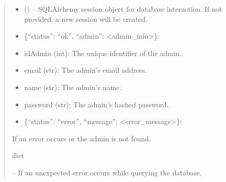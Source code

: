 \documentclass[letterpaper,10pt,english]{sphinxmanual}
\begin{document}
\begin{fulllineitems}
\begin{fulllineitems}
\begin{quote}
\begin{description}
\begin{itemize}
\item {} 
\sphinxAtStartPar
{} (\sphinxstyleliteralemphasis{\sphinxupquote{, }}) – SQLAlchemy session object for database interaction.
If not provided, a new session will be created.

\end{itemize}

\sphinxAtStartPar
\begin{description}
\begin{itemize}
\item {} 
\sphinxAtStartPar
\{“status”: “ok”, “admin”: <admin\_info>\}:

\end{itemize}
\begin{description}
\begin{itemize}
\item {} 
\sphinxAtStartPar
idAdmin (int): The unique identifier of the admin.

\item {} 
\sphinxAtStartPar
email (str): The admin’s email address.

\item {} 
\sphinxAtStartPar
name (str): The admin’s name.

\item {} 
\sphinxAtStartPar
password (str): The admin’s hashed password.

\end{itemize}

\end{description}
\begin{itemize}
\item {} 
\sphinxAtStartPar
\{“status”: “error”, “message”: <error\_message>\}:

\end{itemize}

\sphinxAtStartPar
If an error occurs or the admin is not found.

\end{description}


\sphinxAtStartPar
dict

\sphinxAtStartPar
{} – If an unexpected error occurs while querying the database.


\end{description}
\end{quote}
\end{fulllineitems}
\end{fulllineitems}
\end{document}
